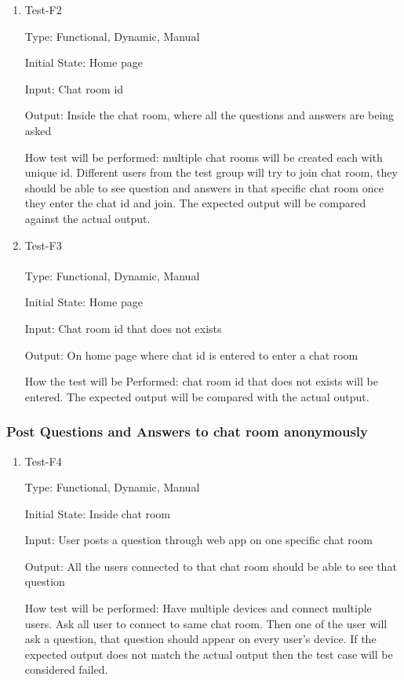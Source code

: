 \documentclass[12pt, titlepage]{article}
\begin{document}
\begin{enumerate}

\item{Test-F2\\}

Type: Functional, Dynamic, Manual
					
Initial State: Home page
					
Input: Chat room id
					
Output: Inside the chat room, where all the questions and answers are being asked 
					
How test will be performed: multiple chat rooms will be created each with unique id. Different users from the test group will try to join chat room, they should be able to see question and answers in that specific chat room once they enter the chat id and join. The expected output will be compared against the actual output.

\item{Test-F3\\\\}
Type: Functional, Dynamic, Manual

Initial State: Home page

Input: Chat room id that does not exists

Output: On home page where chat id is entered to enter a chat room 

How the test will be Performed: chat room id that does not exists will be entered. The expected output will be compared with the actual output. 

\end{enumerate}

\subsubsection{Post Questions and Answers to chat room anonymously}
		

\begin{enumerate}

\item{Test-F4\\}

Type: Functional, Dynamic, Manual
					
Initial State: Inside chat room
					
Input:  User posts a question through web app on one specific chat room
					
Output: All the users connected to that chat room should be able to see that question

How test will be performed: Have multiple devices and connect multiple users. Ask all user to connect to same chat room. Then one of the user will ask a question, that question should appear on every user’s device. If the expected output does not match the actual output then the test case will be considered failed. 
					
\end{enumerate}
\end{document}
